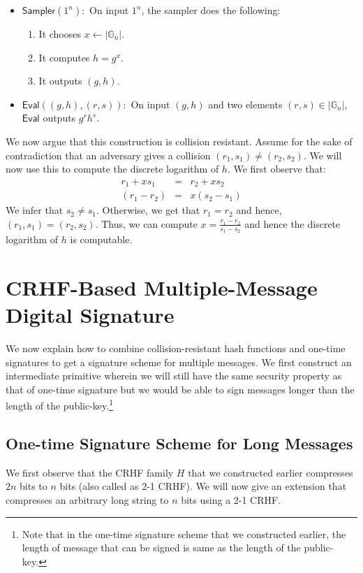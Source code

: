 \documentclass[12pt]{tufte-book}
\newcommand{\Sampler}{\mathsf{Sampler}}
\newcommand{\Eval}{\mathsf{Eval}}
\begin{document}
\begin{itemize}
\item $\Sampler(1^n):$ On input $1^n$, the sampler does the following:
\begin{enumerate}
    \item It chooses $x \gets |\mathbb{G}_n|$.
    \item It computes $h = g^x$.
    \item It outputs $(g,h)$.

\end{enumerate}
\item $\Eval((g,h),(r,s)):$ On input $(g,h)$ and two elements $(r,s) \in |\mathbb{G}_n|$, $\Eval$ outputs $g^rh^s$.
\end{itemize}

We now argue that this construction is collision resistant. Assume for the sake of contradiction that an adversary gives a collision $(r_1,s_1) \neq (r_2,s_2)$. We will now use this to compute the discrete logarithm of $h$. We first observe that:
\begin{eqnarray*}
r_1+xs_1 &=& r_2 + xs_2\\
(r_1 - r_2) &=& x(s_2 - s_1)
\end{eqnarray*}
We infer that $s_2 \neq s_1$. Otherwise, we get that $r_1 = r_2$ and hence, $(r_1,s_1) = (r_2,s_2)$. Thus, we can compute $x = \frac{r_1-r_2}{s_1 - s_2}$ and hence the discrete logarithm of $h$ is computable.


\section{CRHF-Based Multiple-Message Digital Signature}

We now explain how to combine collision-resistant hash functions and one-time signatures to get a signature scheme for multiple messages. We first construct an intermediate primitive wherein we will still have the same security property as that of one-time signature but we would be able to sign messages longer than the length of the public-key.\footnote{Note that in the one-time signature scheme that we constructed earlier, the length of message that can be signed is same as the length of the public-key.}


\subsection{One-time Signature Scheme for Long Messages}
We first observe that the CRHF family $H$ that we constructed earlier compresses $2n$ bits to $n$ bits (also called as 2-1 CRHF). We will now give an extension that compresses an arbitrary long string to $n$ bits using a 2-1 CRHF.
\end{document}
